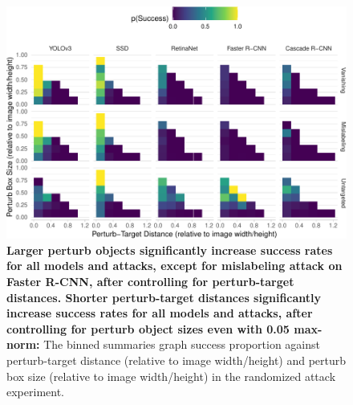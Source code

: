 \begin{figure}[tb]

{\centering \includegraphics{imgs/perturb_bbox_and_object_dist_graph-1} 

}

\caption{\textbf{Larger perturb objects significantly increase success rates for all models and attacks, except for mislabeling attack on Faster R-CNN, after controlling for perturb-target distances. Shorter perturb-target distances significantly increase success rates for all models and attacks, after controlling for perturb object sizes even with 0.05 max-norm:}  The binned summaries graph success proportion against perturb-target distance (relative to image width/height) and perturb box size (relative to image width/height) in the randomized attack experiment.}\label{fig:perturb_bbox_and_object_dist_graph}
\end{figure}

\begingroup\fontsize{9}{11}\selectfont

